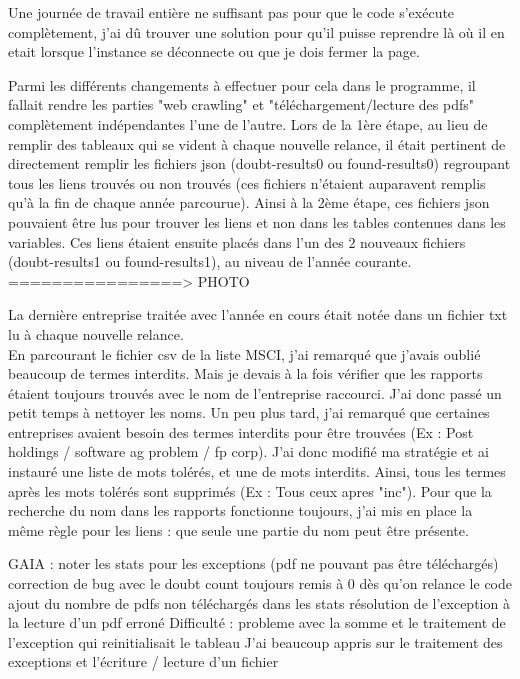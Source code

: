 Une journée de travail entière ne suffisant pas pour que le code s'exécute complètement, j'ai dû trouver une solution pour qu'il puisse reprendre là où il en etait lorsque l'instance se déconnecte ou que je dois fermer la page.

Parmi les différents changements à effectuer pour cela dans le programme, il fallait rendre les parties "web crawling" et "téléchargement/lecture des pdfs" complètement indépendantes l'une de l'autre.
Lors de la 1ère étape, au lieu de remplir des tableaux qui se vident à chaque nouvelle relance, il était pertinent de directement remplir les fichiers json (doubt-results0 ou found-results0) regroupant tous les liens trouvés ou non trouvés (ces fichiers n'étaient auparavent remplis qu'à la fin de chaque année parcourue). 
Ainsi à la 2ème étape, ces fichiers json pouvaient être lus pour trouver les liens et non dans les tables contenues dans les variables.
Ces liens étaient ensuite placés dans l'un des 2 nouveaux fichiers (doubt-results1 ou found-results1), au niveau de l'année courante.
================> PHOTO

La dernière entreprise traitée avec l'année en cours était notée dans un fichier txt lu à chaque nouvelle relance.
\\

En parcourant le fichier csv de la liste MSCI, j'ai remarqué que j'avais oublié beaucoup de termes interdits. 
Mais je devais à la fois vérifier que les rapports étaient toujours trouvés avec le nom de l'entreprise raccourci.
J'ai donc passé un petit temps à nettoyer les noms.
Un peu plus tard, j'ai remarqué que certaines entreprises avaient besoin des termes interdits pour être trouvées (Ex : Post holdings / software ag problem / fp corp).
J'ai donc modifié ma stratégie et ai instauré une liste de mots tolérés, et une de mots interdits. Ainsi, tous les termes après les mots tolérés sont supprimés (Ex : Tous ceux apres "inc").
Pour que la recherche du nom dans les rapports fonctionne toujours, j'ai mis en place la même règle pour les liens : que seule une partie du nom peut être présente.

GAIA : noter les stats pour les exceptions (pdf ne pouvant pas être téléchargés)
correction de bug avec le doubt count toujours remis à 0 dès qu’on relance le code
ajout du nombre de pdfs non téléchargés dans les stats
résolution de l’exception à la lecture d’un pdf erroné
Difficulté : probleme avec la somme et le traitement de l’exception qui reinitialisait le tableau
J’ai beaucoup appris sur le traitement des exceptions et l’écriture / lecture d’un fichier

